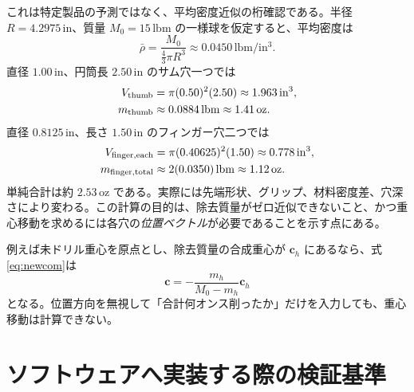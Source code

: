 \documentclass[11pt,a4paper]{article}
\newcommand{\vect}[1]{\bm{#1}}
\newcommand{\unit}[1]{\,\mathrm{#1}}
\begin{document}
これは特定製品の予測ではなく、平均密度近似の桁確認である。半径
$R=4.2975\unit{in}$、質量 $M_0=15\unit{lbm}$ の一様球を仮定すると、平均密度は
\begin{equation}
 \bar\rho=\frac{M_0}{\frac43\pi R^3}
 \approx0.0450\unit{lbm/in^3}.
\end{equation}
直径 $1.00\unit{in}$、円筒長 $2.50\unit{in}$ のサム穴一つでは
\begin{align}
 V_{\rm thumb}&=\pi(0.50)^2(2.50)\approx1.963\unit{in^3},\\
 m_{\rm thumb}&\approx0.0884\unit{lbm}\approx1.41\unit{oz}.
\end{align}
直径 $0.8125\unit{in}$、長さ $1.50\unit{in}$ のフィンガー穴二つでは
\begin{align}
 V_{\rm finger,each}&=\pi(0.40625)^2(1.50)\approx0.778\unit{in^3},\\
 m_{\rm finger,total}&\approx2(0.0350)\unit{lbm}\approx1.12\unit{oz}.
\end{align}
単純合計は約 $2.53\unit{oz}$ である。実際には先端形状、グリップ、材料密度差、穴深さにより変わる。この計算の目的は、除去質量がゼロ近似できないこと、かつ重心移動を求めるには各穴の\emph{位置ベクトル}が必要であることを示す点にある。

例えば未ドリル重心を原点とし、除去質量の合成重心が $\vect c_h$ にあるなら、式\eqref{eq:newcom}は
\begin{equation}
 \vect c=-\frac{m_h}{M_0-m_h}\vect c_h
\end{equation}
となる。位置方向を無視して「合計何オンス削ったか」だけを入力しても、重心移動は計算できない。

\section{ソフトウェアへ実装する際の検証基準}
\end{document}
